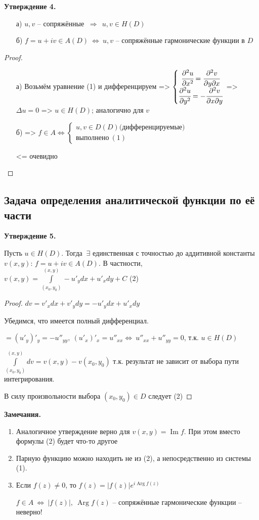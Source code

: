 \documentclass[draft]{article}
\newcommand{\dd}{\partial}
\newcommand{\then}{\ \Rightarrow\ }
\newcommand{\mint}[2]{\underset{#1}{\overset{#2}{\int}}}
\newcommand{\LRA}{\Leftrightarrow}
\renewcommand{\Im}{\mathop{\mathrm{Im}}\nolimits}
\newcommand{\Arg}{\mathop{\mathrm{Arg}}\nolimits}
\newcommand{\D}{\Delta}
\newcommand{\E}{\ \exists}
\newcommand{\sys}[1]{\left\{\begin{matrix}#1\end{matrix}\right.}
\theoremstyle{remark}
\begin{document}
{\bfseries Утверждение 4.}
\begin{itemize}
\item[а)] $u,v$ -- сопряжённые $\then\ u,v\in H(D)$
\item[б)] $f=u+iv\in A(D)\ \LRA\ u,v$ -- сопряжённые гармонические функции в $D$
\end{itemize}

\begin{proof}
\begin{itemize}
\item[а)] Возьмём уравнение (1) и дифференцируем =>
$\sys{\cfrac{\dd^2u}{\dd x^2}=\cfrac{\dd^2v}{\dd y\dd x} \\ \cfrac{\dd^2u}{\dd y^2}=-\cfrac{\dd^2v}{\dd x\dd y}}$
 => $\D u=0$ => $u\in H(D)$; аналогично для $v$
\item[б)] => $f\in A\LRA \sys{u,v\in D(D) \mbox{(дифференцируемые)} \\ \mbox{выполнено}\ (1)}$

<= очевидно
\end{itemize}
\end{proof}

\subsection{Задача определения аналитической функции по её части}

{\bfseries Утверждение 5.}

Пусть $u\in H(D)$. Тогда $\E$ единственная с точностью до аддитивной константы $v(x,y)$: $f=u+iv\in A(D)$. В частности, $v(x,y)=\mint{(x_0,y_0)}{(x,y)}-u'_ydx+u'_xdy+C$ (2)

\begin{proof}
$dv=v'_xdx+v'_ydy=-u'_ydx+u'_xdy$

Убедимся, что имеется полный дифференциал.

$=(u'_y)'_y=-u''_{yy},\ (u'_x)'_x=u''_{xx} \LRA\ u''_{xx}+u''_{yy}=0$, т.к. $u\in H(D)$

$\mint{(x_0,y_0)}{(x,y)}dv=v(x,y)-v(x_0,y_0)$ т.к. результат не зависит от выбора пути интегрирования.

В силу произвольности выбора $(x_0,y_0)\in D$ следует (2)
\end{proof}

{\bfseries Замечания.}
\begin{enumerate}
\item Аналогичное утверждение верно для $v(x,y)=\Im f$. При этом вместо формулы (2) будет что-то другое
\item Парную функцию можно находить не из (2), а непосредственно из системы (1).
\item Если $f(z)\neq 0$, то $f(z)=|f(z)|e^{i\Arg f(z)}$

$f\in A\ \LRA\ |f(z)|,\ \Arg f(z)$ -- сопряжённые гармонические функции -- неверно!
\end{enumerate}
\end{document}
